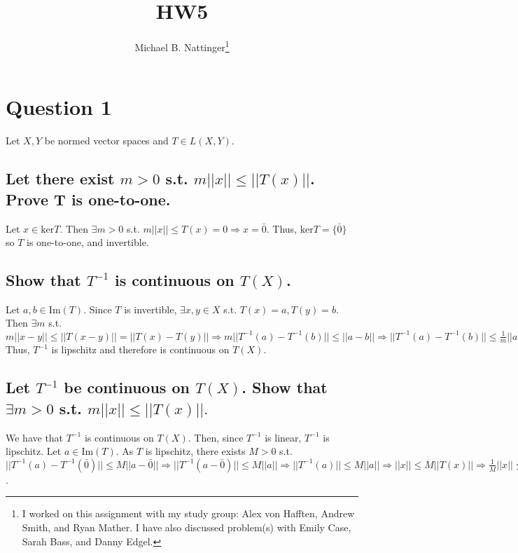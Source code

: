 \documentclass[11pt]{article} %
\title{HW5}
\author{Michael B. Nattinger\footnote{I worked on this assignment with my study group: Alex von Hafften, Andrew Smith, and Ryan Mather. I have also discussed problem(s) with Emily Case, Sarah Bass, and Danny Edgel.}}
\begin{document}
\maketitle

\section{Question 1}
Let $X,Y$ be normed vector spaces and $T \in L(X,Y)$.
\subsection{Let there exist $m>0$ s.t. $m||x|| \leq ||T(x)||$. Prove T is one-to-one.}
Let $x \in \text{ker}T.$ Then $\exists m>0$ s.t. $m||x|| \leq T(x) = 0 \Rightarrow x = \bar{0}.$ Thus, $\text{ker}T = \{ \bar{0}\} $ so $T$ is one-to-one, and invertible.
\subsection{Show that $T^{-1}$ is continuous on $T(X)$.}



Let $a,b \in \text{Im}(T).$ Since $T$ is invertible, $\exists x,y \in X$ s.t. $T(x) = a,T(y)=b.$ Then $\exists m$ s.t. $m||x-y|| \leq ||T(x-y)|| = ||T(x) - T(y)|| \Rightarrow m||T^{-1}(a)-T^{-1}(b)|| \leq ||a- b|| \Rightarrow ||T^{-1}(a)-T^{-1}(b)|| \leq \frac{1}{m} ||a- b||.$ Thus, $T^{-1}$ is lipschitz and therefore is continuous on $T(X)$.
\subsection{Let $T^{-1}$ be continuous on $T(X)$. Show that $\exists m>0$ s.t. $m||x|| \leq ||T(x)||.$}
We have that $T^{-1}$ is continuous on $T(X).$ Then, since $T^{-1}$ is linear, $T^{-1}$ is lipschitz. Let $a \in \text{Im}(T)$. As $T$ is lipschitz, there exists $M>0$ s.t. $||T^{-1}(a) - T^{-1}(\bar{0})|| \leq M ||a - \bar{0}|| \Rightarrow ||T^{-1}(a - \bar{0})|| \leq M||a|| \Rightarrow  ||T^{-1}(a)|| \leq M||a|| \Rightarrow ||x|| \leq M ||T(x)|| \Rightarrow \frac{1}{M}||x|| \leq ||T(x)||$.
\end{document}
